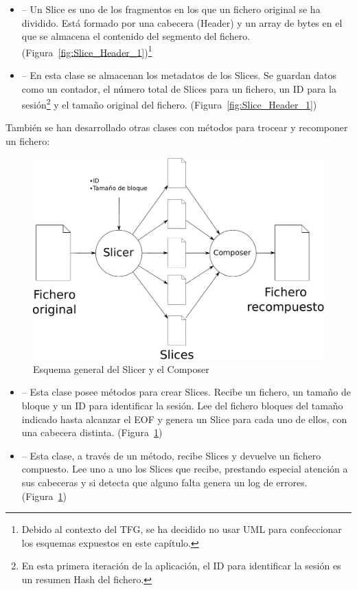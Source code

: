 \begin{itemize}
  \item {} -- Un Slice es uno de los fragmentos en los que un
  fichero original se ha dividido. Está formado por una cabecera (Header) y un
  array de bytes en el que se almacena el contenido del segmento del fichero.
  (Figura~\ref{fig:Slice_Header_1})\footnote{Debido al contexto del TFG, se ha
  decidido no usar UML para confeccionar los esquemas expuestos en este
  capítulo.}

  \item {} -- En esta clase se almacenan los metadatos de los
  Slices. Se guardan datos como un contador, el número total de Slices
  para un fichero, un ID para la sesión\footnote{En esta primera iteración de la
  aplicación, el ID para identificar la sesión es un resumen Hash del fichero.}
  y el tamaño original del fichero. (Figura~\ref{fig:Slice_Header_1})
\end{itemize}

También se han desarrollado otras clases con métodos para trocear y recomponer
un fichero:

\begin{figure}[ht]
  \centering
  \includegraphics[scale=0.5]{Figures/Assembler}
  \decoRule
  \caption[Slicer - Composer]{Esquema general del Slicer y el Composer}
  \label{fig:Assembler}
\end{figure}

\begin{itemize}
  \item {} -- Esta clase posee métodos para crear Slices. Recibe
  un fichero, un tamaño de bloque y un ID para identificar la sesión. Lee del
  fichero bloques del tamaño indicado hasta alcanzar el EOF y genera un Slice
  para cada uno de ellos, con una cabecera distinta.
  (Figura~\ref{fig:Assembler})

  \item {} -- Esta clase, a través de un método, recibe Slices
  y devuelve un fichero compuesto. Lee uno a uno los Slices que recibe,
  prestando especial atención a sus cabeceras y si detecta que alguno falta
  genera un log de errores. (Figura~\ref{fig:Assembler})
\end{itemize}

